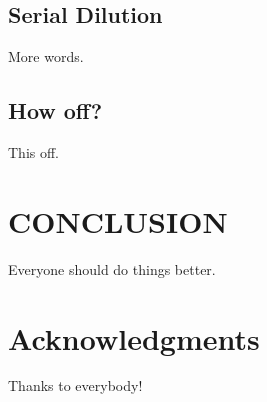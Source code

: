 \documentclass[aps,pre,twocolumn,nofootinbib,superscriptaddress,linenumbers]{revtex4-1}
\begin{document}
\subsection*{Serial Dilution}

More words.

\subsection*{How off?}

This off.

\section{CONCLUSION}

Everyone should do things better.

\section{Acknowledgments}
\label{section:acknowledgments}

Thanks to everybody!


 

\end{document}
